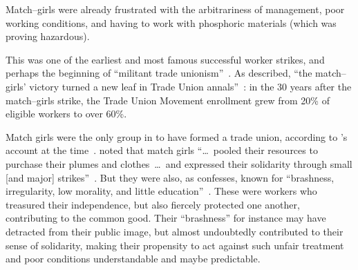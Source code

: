 \documentclass[trackingWork]{subfiles}
\begin{document}
Match--girls were already frustrated with
the arbitrariness of management,
poor working conditions, and
having to work with phosphoric materials (which was proving hazardous).

This was one of the earliest and most famous successful worker strikes,
and perhaps the beginning of ``militant trade unionism''~\cite{10.2307/3827491}.
As \citeauthor{weyer1894history} described,
``the match--girls' victory turned a new leaf in Trade Union annals''~\cite{weyer1894history}: in the 30 years after the match--girls strike,
the Trade Union Movement enrollment grew from 20\% of eligible workers to over 60\%.

Match girls were the only group in \citeyear{booth1903life} to have formed a trade union,
according to \citeauthor{booth1903life}'s account at the time~\cite{booth1903life}.
\citeauthor{10.2307/3827491} noted that match girls
``\dots~pooled their resources to purchase their plumes and clothes~\dots~and expressed their solidarity through small [and major] strikes''~\cite{booth1903life}.
But they were also, as \citeauthor{10.2307/3827491} confesses, known for ``brashness, irregularity, low morality, and little education''~\cite{10.2307/3827491}.
These were workers who treasured their independence, but also fiercely protected one another, contributing to the common good.
Their ``brashness'' for instance may have detracted from their public image, but almost undoubtedly contributed to their sense of solidarity,
making their propensity to act against such unfair treatment and poor conditions understandable and maybe predictable.



\end{document}
